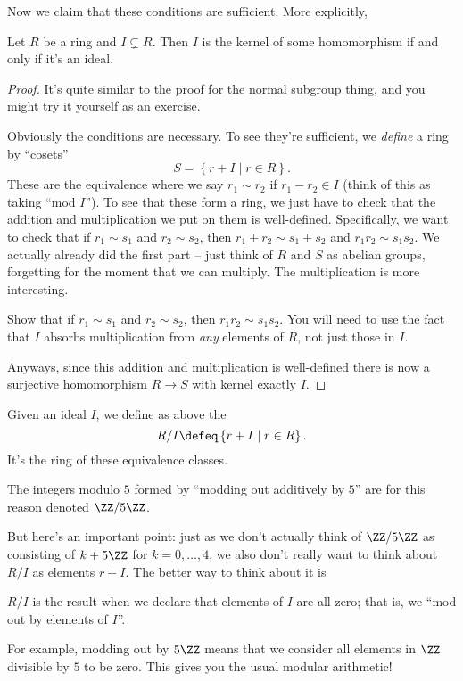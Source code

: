 Now we claim that these conditions are sufficient.
More explicitly,
\begin{theorem}
	Let $R$ be a ring and $I \subsetneq R$.
	Then $I$ is the kernel of some homomorphism if and only if it's an ideal.
\end{theorem}
\begin{proof}
	It's quite similar to the proof for the normal subgroup thing,
	and you might try it yourself as an exercise.
	
	Obviously the conditions are necessary.
	To see they're sufficient, we \emph{define} a ring by ``cosets''
	\[ S = \left\{ r + I \mid r \in R \right\}. \]
	These are the equivalence where we say $r_1 \sim r_2$ if $r_1 - r_2 \in I$
	(think of this as taking ``mod $I$'').
	To see that these form a ring, we just have to check that the addition
	and multiplication we put on them is well-defined.
	Specifically, we want to check that if $r_1 \sim s_1$ and $r_2 \sim s_2$,
	then $r_1 + r_2 \sim s_1 + s_2$ and $r_1r_2 \sim s_1s_2$.
	We actually already did the first part -- just think of $R$ and $S$ as abelian
	groups, forgetting for the moment that we can multiply.
	The multiplication is more interesting.
	\begin{exercise}
		[Recommended]
		Show that if $r_1 \sim s_1$ and $r_2 \sim s_2$, then $r_1r_2 \sim s_1s_2$.
		You will need to use the fact that $I$ absorbs multiplication
		from \emph{any} elements of $R$, not just those in $I$.
	\end{exercise}
	Anyways, since this addition and multiplication is well-defined there
	is now a surjective homomorphism $R \to S$ with kernel exactly $I$.
\end{proof}

\begin{definition}
	Given an ideal $I$, we define as above the 
	\[ R/I \defeq \left\{ r+I \mid r \in R \right\}. \]
	It's the ring of these equivalence classes.
\end{definition}
\begin{example}[$\ZZ/5\ZZ$]
	The integers modulo $5$ formed by ``modding out additively by $5$''
	are for this reason denoted $\ZZ / 5\ZZ$.
\end{example}
But here's an important point:
just as we don't actually think of $\ZZ/5\ZZ$ as consisting of
$k + 5\ZZ$ for $k=0,\dots,4$,
we also don't really want to think about $R/I$ as elements $r+I$.
The better way to think about it is
\begin{moral}
	$R/I$ is the result when we declare that elements of $I$ are all zero;
	that is, we ``mod out by elements of $I$''.
\end{moral}
For example, modding out by $5\ZZ$ means that we consider
all elements in $\ZZ$ divisible by $5$ to be zero.
This gives you the usual modular arithmetic!


